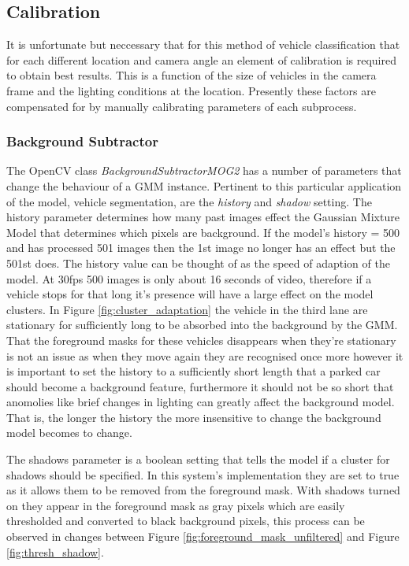 \subsection{Calibration}
\label{ref:calibration}

It is unfortunate but neccessary that for this method of vehicle classification that for each different location and camera angle an element of calibration is required to obtain best results. This is a function of the size of vehicles in the camera frame and the lighting conditions at the location. Presently these factors are compensated for by manually calibrating parameters of each subprocess.

\subsubsection{Background Subtractor}

The OpenCV class \emph{BackgroundSubtractorMOG2} has a number of parameters that change the behaviour of a GMM instance. Pertinent to this particular application of the model, vehicle segmentation, are the \emph{history} and \emph{shadow} setting. The history parameter determines how many past images effect the Gaussian Mixture Model that determines which pixels are background. If the model's history = 500 and has processed 501 images then the 1st image no longer has an effect but the 501st does. The history value can be thought of as the speed of adaption of the model. At 30fps 500 images is only about 16 seconds of video, therefore if a vehicle stops for that long it's presence will have a large effect on the model clusters. In Figure \ref{fig:cluster_adaptation} the vehicle in the third lane are stationary for sufficiently long to be absorbed into the background by the GMM. That the foreground masks for these vehicles disappears when they're stationary is not an issue as when they move again they are recognised once more however it is important to set the history to a sufficiently short length that a parked car should become a background feature, furthermore it should not be so short that anomolies like brief changes in lighting can greatly affect the background model. That is, the longer the history the more insensitive to change the background model becomes to change. 

The shadows parameter is a boolean setting that tells the model if a cluster for shadows should be specified. In this system's implementation they are set to true as it allows them to be removed from the foreground mask. With shadows turned on they appear in the foreground mask as gray pixels which are easily thresholded and converted to black background pixels, this process can be observed in changes between Figure \ref{fig:foreground_mask_unfiltered} and Figure \ref{fig:thresh_shadow}.

